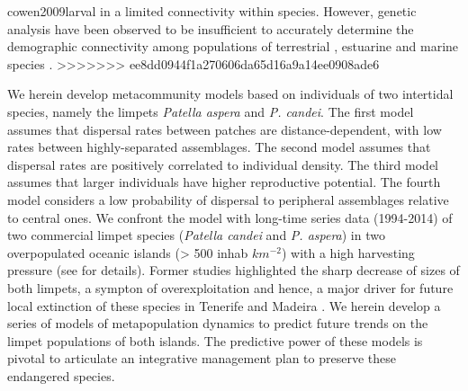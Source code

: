\documentclass[12pt]{article}
\begin{document}
\begin{flushleft}
{{{{{{cowen2009larval} in a limited connectivity within species. However, genetic analysis have been observed to be insufficient to accurately determine the demographic connectivity among populations of terrestrial \citep{chapuis2011challenges}, estuarine \citep{turner2002genetic} and marine species \citep{hawkins2016fisheries}.
>>>>>>> ee8dd0944f1a270606da65d16a9a14ee0908ade6

We herein develop metacommunity models based on individuals of two intertidal species, namely the limpets \textit{Patella aspera} and \textit{P. candei}. The first model assumes that dispersal rates between patches are distance-dependent, with low rates between highly-separated assemblages. The second model assumes that dispersal rates are positively correlated to individual density. The third model assumes that larger individuals have higher reproductive potential. The fourth model considers a low probability of dispersal to peripheral assemblages relative to central ones. We confront the model with long-time series data (1994-2014) of two commercial limpet species (\textit{Patella candei} and \textit{P. aspera}) in two overpopulated oceanic islands (> 500 inhab $km^{-2}$) with a high harvesting pressure (see \citep{riera2016clear, sousa2019long}for details). Former studies highlighted the sharp decrease of sizes of both limpets, a sympton of overexploitation and hence, a major driver for future local extinction of these species in Tenerife \citep{riera2016clear} and Madeira \citep{sousa2019long}. We herein develop a series of models of metapopulation dynamics to predict future trends on the limpet populations of both islands. The predictive power of these models is pivotal to articulate an integrative management plan to preserve these endangered species.

}}}}}
\end{flushleft}
\end{document}
